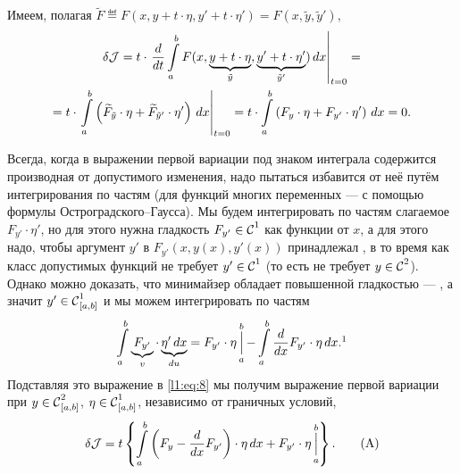 Имеем, полагая $\widetilde{F}\eqdef F(x,y+t\cdot\eta,y'+t\cdot\eta')=F(x,\tilde{y},\tilde{y}')$,
\begin{multline}
	\label{l1:eq:8}
	\delta\J=t\cdot\left.\der{}{t}\int\limits_a^b F(x,\underbrace{y+t\cdot\eta}_{\tilde{y}},\underbrace{y'+t\cdot\eta'}_{\tilde{y}'})\,\dd{x}\right|_{t=0}=\\=t\cdot\left.\int\limits_a^b \left(\widetilde{F}_{\tilde{y}}\cdot\eta+\widetilde{F}_{\tilde{y}'}\cdot\eta'\right)\,\dd{x}\right|_{t=0}
	=t\cdot\int\limits_a^b \left({F}_{{y}}\cdot\eta+{F}_{{y}'}\cdot\eta'\right)\,\dd{x}=0.
\end{multline}

Всегда, когда в выражении первой вариации под знаком интеграла содержится производная от допустимого изменения, надо пытаться избавится от неё путём интегрирования по частям (для функций многих переменных --- с помощью формулы Остроградского--Гаусса). Мы будем интегрировать по частям слагаемое $F_{y'}\cdot\eta'$, но для этого нужна гладкость $F_{y'}\in\Cfn[]{1}$ как функции от $x$, а для этого надо, чтобы аргумент $y'$ в $F_{y'}(x,y(x),y'(x))$ принадлежал , в то время как класс допустимых функций не требует $y'\in\Cfn[]{1}$ (то есть не требует $y\in\Cfn[]{2}$). Однако можно доказать, что минимайзер обладает повышенной гладкостью --- , а значит $y'\in\Cfn[{[a,b]}]{1}$ и мы можем интегрировать по частям
\begin{equation}
	\label{l1:eq:9}
	\int\limits_a^b \underbrace{F_{y'}}_{v}\cdot\underbrace{\eta'\,\dd{x}}_{du}=F_{y'}\cdot\eta\mathop{\Big|}\limits_a^b-\int\limits_a^b \der{}{x}F_{y'}\cdot\eta\,\dd{x}.\footnotemark{}
\end{equation}
Подставляя это выражение в \eqref{l1:eq:8} мы получим выражение первой вариации при $y\in\Cfn[{[a,b]}]{2}$, $\eta\in\Cfn[{[a,b]}]{1}$, независимо от граничных условий,
\begin{equation}
	\label{l1:eq:A}
	 \delta\J=t\left\{\int\limits_a^b\left(F_y-\der{}{x}F_{y'}\right)\cdot\eta\,\dd{x}+F_{y'}\cdot\eta\mathop{\Big|}\limits_a^b\right\}.\tag{A}
\end{equation}

